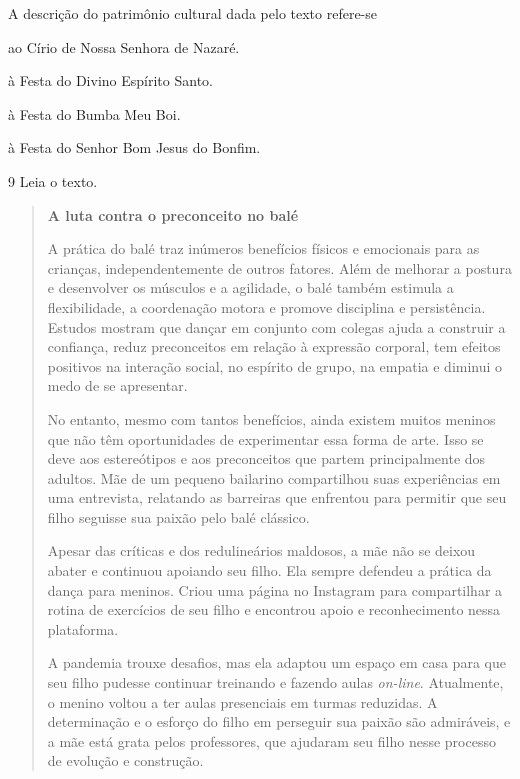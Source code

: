 A descrição do patrimônio cultural dada pelo texto refere-se

\begin{escolha}
\item
  ao Círio de Nossa Senhora de Nazaré.
\item
  à Festa do Divino Espírito Santo.
\item
  à Festa do Bumba Meu Boi.
\item
  à Festa do Senhor Bom Jesus do Bonfim.
\end{escolha}

\num{9} Leia o texto.

\begin{quote}
\textbf{A luta contra o preconceito no balé}

A prática do balé traz inúmeros benefícios físicos e emocionais para as crianças, independentemente de 
outros fatores. Além de melhorar a postura e desenvolver os músculos e a agilidade, o balé também estimula 
a flexibilidade, a coordenação motora e promove disciplina e persistência. Estudos mostram que dançar em 
conjunto com colegas ajuda a construir a confiança, reduz preconceitos em relação à expressão corporal, tem 
efeitos positivos na interação social, no espírito de grupo, na empatia e diminui o medo de se apresentar.

No entanto, mesmo com tantos benefícios, ainda existem muitos meninos que não têm oportunidades de 
experimentar essa forma de arte. Isso se deve aos estereótipos e aos preconceitos que partem principalmente 
dos adultos. Mãe de um pequeno bailarino compartilhou suas experiências em uma entrevista, relatando as 
barreiras que enfrentou para permitir que seu filho seguisse sua paixão pelo balé clássico.

Apesar das críticas e dos redulineários maldosos, a mãe não se deixou abater e continuou apoiando seu filho. 
Ela sempre defendeu a prática da dança para meninos. Criou uma página no Instagram para compartilhar a rotina de exercícios de seu filho e encontrou apoio e reconhecimento nessa plataforma.

A pandemia trouxe desafios, mas ela adaptou um espaço em casa para que seu filho pudesse continuar 
treinando e fazendo aulas \textit{on-line}. Atualmente, o menino voltou a ter aulas presenciais em turmas 
reduzidas. A determinação e o esforço do filho em perseguir sua paixão são admiráveis, e a mãe está grata pelos professores, que ajudaram seu filho nesse processo de evolução e construção.

\end{quote}

